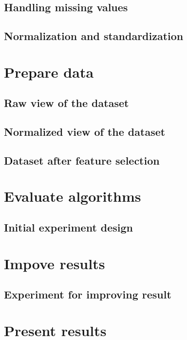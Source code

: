 \section{Handling missing values}
\section{Normalization and standardization}

\chapter{Prepare data}
\section{Raw view of the dataset}
\section{Normalized view of the dataset}
\section{Dataset after feature selection}

\chapter{Evaluate algorithms}
\section{Initial experiment design}

\chapter{Impove results}
\section{Experiment for improving result}

\chapter{Present results}